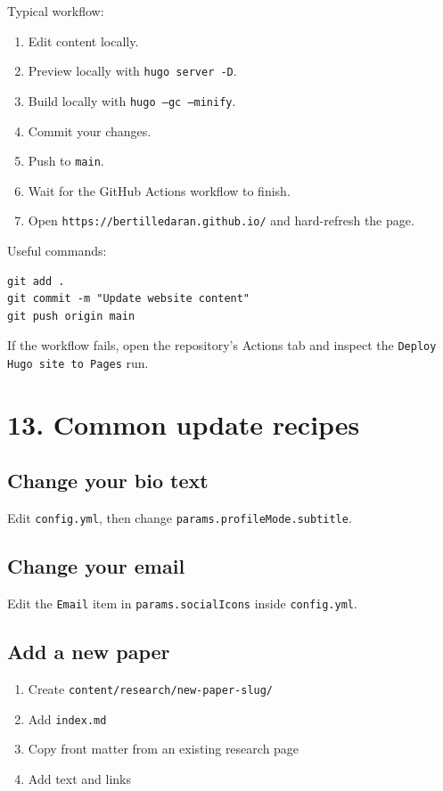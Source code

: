 \documentclass[11pt]{article}
\begin{document}
Typical workflow:
\begin{enumerate}
\item Edit content locally.
\item Preview locally with \texttt{hugo server -D}.
\item Build locally with \texttt{hugo --gc --minify}.
\item Commit your changes.
\item Push to \texttt{main}.
\item Wait for the GitHub Actions workflow to finish.
\item Open \texttt{https://bertilledaran.github.io/} and hard-refresh the page.
\end{enumerate}

Useful commands:
\begin{verbatim}
git add .
git commit -m "Update website content"
git push origin main
\end{verbatim}

If the workflow fails, open the repository's Actions tab and inspect the \texttt{Deploy Hugo site to Pages} run.

\section*{13. Common update recipes}
\subsection*{Change your bio text}
Edit \texttt{config.yml}, then change \texttt{params.profileMode.subtitle}.

\subsection*{Change your email}
Edit the \texttt{Email} item in \texttt{params.socialIcons} inside \texttt{config.yml}.

\subsection*{Add a new paper}
\begin{enumerate}
\item Create \texttt{content/research/new-paper-slug/}
\item Add \texttt{index.md}
\item Copy front matter from an existing research page
\item Add text and links
\end{enumerate}
\end{document}
